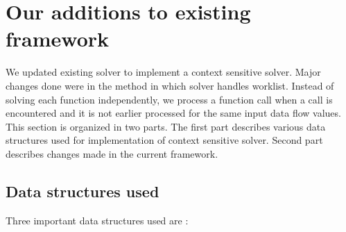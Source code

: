 \documentclass[12pt]{report}
\begin{document}
\section{Our additions to existing framework}

We updated existing solver to implement a context sensitive solver. Major changes done were in the method in which solver handles worklist. Instead of solving each function independently, we process a function call when a call is encountered and it is not earlier processed for the same input data flow values. This section is organized in two parts. The first part describes various data structures used for implementation of context sensitive solver. Second part describes changes made in the current framework.

\subsection{Data structures used}
 Three important data structures used are :
\end{document}
